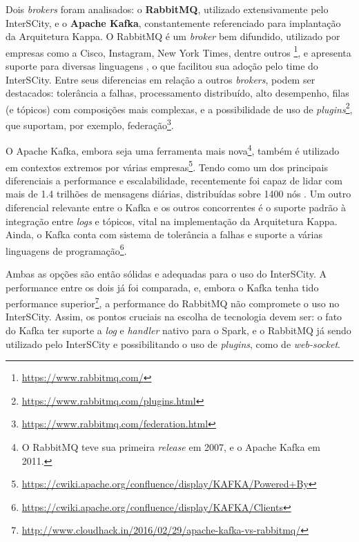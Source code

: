 Dois \textit{brokers} foram analisados: o \textbf{RabbitMQ},  utilizado
extensivamente pelo InterSCity, e o \textbf{Apache Kafka}, constantemente
referenciado para implantação da Arquitetura Kappa. O RabbitMQ é um
\textit{broker} bem difundido, utilizado por empresas como a Cisco, Instagram,
New York Times, dentre outros \footnote{\url{https://www.rabbitmq.com/}},
e apresenta suporte para diversas linguagens \cite{zaitsev2014}, o que
facilitou sua adoção pelo time do InterSCity. Entre seus diferencias em relação
a outros \textit{brokers}, podem ser destacados: tolerância a falhas,
processamento distribuído, alto desempenho, filas (e tópicos) com composições
mais complexas, e a possibilidade de uso de
\textit{plugins}\footnote{\url{https://www.rabbitmq.com/plugins.html}},
que suportam, por exemplo,
federação\footnote{\url{https://www.rabbitmq.com/federation.html}}.

O Apache Kafka, embora seja uma ferramenta mais nova\footnote{O RabbitMQ teve
sua primeira \textit{release} em 2007, e o Apache Kafka em 2011.}, também é
utilizado em contextos extremos por várias
empresas\footnote{\url{https://cwiki.apache.org/confluence/display/KAFKA/Powered+By}}.
Tendo como um dos principais diferenciais a performance e escalabilidade,
recentemente foi capaz de lidar com mais de 1.4 trilhões de mensagens diárias,
distribuídas sobre 1400 nós \cite{koshy2016}. Um outro diferencial relevante
entre o Kafka e os outros concorrentes é o suporte padrão à integração entre
\textit{logs} e tópicos, vital na implementação da Arquitetura Kappa. Ainda,
o Kafka conta com sistema de tolerância a falhas e suporte a várias linguagens de
programação\footnote{\url{https://cwiki.apache.org/confluence/display/KAFKA/Clients}}.

Ambas as opções são então sólidas e adequadas para o uso do InterSCity. A
performance entre os dois já foi comparada, e, embora o Kafka tenha tido
performance
superior\footnote{\url{http://www.cloudhack.in/2016/02/29/apache-kafka-vs-rabbitmq/}},
a performance do RabbitMQ não compromete o uso no InterSCity. Assim, os pontos
cruciais na escolha de tecnologia devem ser: o fato do Kafka ter suporte a
\textit{log} e \textit{handler} nativo para o Spark, e o RabbitMQ já sendo
utilizado pelo InterSCity e possibilitando o uso de \textit{plugins}, como de
\textit{web-socket}.

